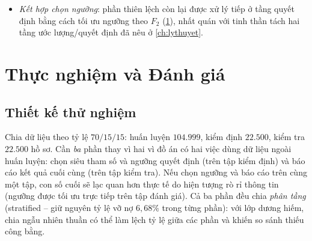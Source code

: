 \documentclass[12pt,a4paper,oneside]{report}
\theoremstyle{vnplain}
\theoremstyle{vndef}
\newcommand{\wv}{\mathbf{w}}
\begin{document}
\begin{itemize}
\begin{itemize}
                \begin{equation}
                  w_k = \frac{N}{K \cdot N_k}
                  \label{eq:classweight}
                \end{equation}
                trong đó $N$ là tổng số mẫu ($149.999$), $K=2$ là số lớp, và $N_k$ là số mẫu lớp $k$. Công thức này gán trọng số $w_1 \approx 7{,}54$ cho mẫu vỡ nợ và $w_0 \approx 0{,}54$ cho mẫu thường, và hàm mất mát cross-entropy trở thành:
                \begin{equation}
                  \mathcal{L}(\wv,b) = -\frac{1}{N}\sum_{i=1}^{N} w_{y_i} \Big[ y_i \log p_i + (1 - y_i) \log (1 - p_i) \Big].
                  \label{eq:weightedloss}
                \end{equation}
          \item Với XGBoost, tham số \texttt{scale\_pos\_weight} $= n_- / n_+ \approx 14$ được sử dụng làm hệ số nhân cho gradient $g_i$ và Hessian $h_i$ của các mẫu thuộc lớp dương ($y_i=1$) khi tính toán trọng số lá tối ưu và độ lợi phép chia (\cref{dl:xgb}):
                \begin{equation}
                  g_i = w_{y_i}(p_i - y_i), \qquad h_i = w_{y_i} p_i(1 - p_i)
                  \label{eq:scaledgrad}
                \end{equation}
                với $w_1 = 14$ và $w_0 = 1$. Việc này buộc quá trình tối ưu của thuật toán boosting phải nhấn mạnh lỗi trên nhóm khách hàng vỡ nợ lên gấp 14 lần mà không làm méo mó phân phối dữ liệu đầu vào.
        \end{itemize}
  \item \emph{Kết hợp chọn ngưỡng}: phần thiên lệch còn lại được xử lý tiếp ở tầng quyết
        định bằng cách tối ưu ngưỡng theo $F_2$ (\cref{ch:thucnghiem}), nhất quán với tinh thần
        tách hai tầng ước lượng/quyết định đã nêu ở \cref{ch:lythuyet}.
\end{itemize}

\chapter{Thực nghiệm và Đánh giá}\label{ch:thucnghiem}

\section{Thiết kế thử nghiệm}
Chia dữ liệu theo tỷ lệ $70/15/15$: huấn luyện $104.999$, kiểm định $22.500$, kiểm tra
$22.500$ hồ sơ. Cần \emph{ba} phần thay vì hai vì đồ án có hai việc dùng dữ liệu ngoài
huấn luyện: chọn siêu tham số và ngưỡng quyết định (trên tập kiểm định) và báo cáo kết
quả cuối cùng (trên tập kiểm tra). Nếu chọn ngưỡng và báo cáo trên cùng một tập, con số
cuối sẽ lạc quan hơn thực tế do hiện tượng rò rỉ thông tin (ngưỡng được tối ưu trực tiếp trên tập đánh giá). Cả ba phần đều chia
\emph{phân tầng} (stratified -- giữ nguyên tỷ lệ vỡ nợ $6{,}68\%$ trong từng phần): với
lớp dương hiếm, chia ngẫu nhiên thuần có thể làm lệch tỷ lệ giữa các phần và khiến so
sánh thiếu công bằng. 
\end{document}
